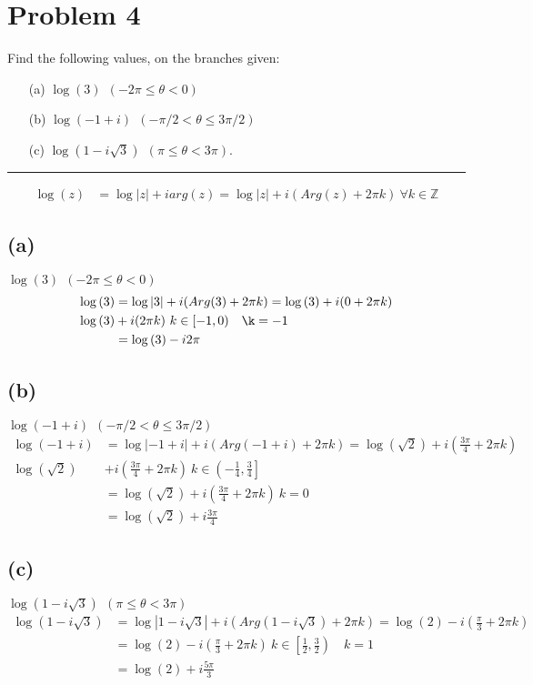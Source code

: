 \documentclass{article}
\begin{document}
\section*{Problem 4}
Find the following values, on the branches given:
\begin{enumerate}
	\item [(a)] $ \log(3) \ \ (-2\pi \leq \theta < 0)$ 
	\item [(b)] $ \log(-1 + i) \ \ (-\pi/2 < \theta \leq 3 \pi / 2)$
	\item [(c)] $ \log(1 - i \sqrt 3) \ \ (\pi \leq \theta < 3 \pi)$.
\end{enumerate}
\hrule
\vspace{.5cm} %

\begin{align*}
  \log(z) &= \log{|z|} + iarg(z) = \log{|z|} + i(Arg(z) + 2\pi k)\ \forall k \in \mathbb{Z}
\end{align*}
\subsection*{(a)}
$ \log{(3)} \ \ (-2\pi \leq \theta < 0)$
\begin{align*}
  \log{(3)} &=  \log{|3|} + i(Arg(3) + 2\pi k)= \log{(3)} + i(0 +  2\pi k)\\
  \log{(3)} &+ i(2\pi k)\ k \in [-1,0) \quad \k = -1\\
  &= \log{(3)} - i2\pi
\end{align*}
\subsection*{(b)}
$ \log(-1 + i) \ \ (-\pi/2 < \theta \leq 3 \pi / 2)$
\begin{align*}
  \log{(-1 + i)} &=  \log{|-1 + i|} + i(Arg(-1 + i) + 2\pi k)= \log{(\sqrt{2})} + i\left(\frac{3\pi}{4} +  2\pi k\right)\\
  \log{(\sqrt{2})} &+ i\left(\frac{3\pi}{4}+2\pi k\right)\ k \in \left(-\frac{1}{4}, \frac{3}{4}\right]\\
                 &= \log{(\sqrt{2})} + i\left(\frac{3\pi}{4}+2\pi k\right) \ k = 0\\
                 &= \log{(\sqrt{2})} + i\frac{3\pi}{4}
\end{align*}
\subsection*{(c)}
$ \log(1 - i \sqrt 3) \ \ (\pi \leq \theta < 3 \pi)$
\begin{align*}
  \log{(1-i\sqrt{3})} &=  \log{|1-i\sqrt{3}|} + i(Arg(1-i\sqrt{3}) + 2\pi k)= \log{(2)} - i\left(\frac{\pi}{3} +  2\pi k\right)\\
  &= \log{(2)} - i\left(\frac{\pi}{3} +  2\pi k\right) \ k\in \left[\frac{1}{2},\frac{3}{2}\right) \quad k = 1\\
  &= \log{(2)} +i\frac{5\pi}{3} 
\end{align*}
\newpage
\end{document}
